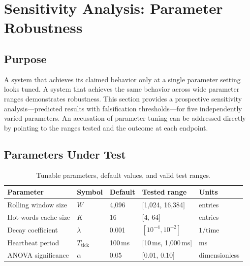 
\section{Sensitivity Analysis: Parameter Robustness}
\label{sec:sensitivity-analysis}

\subsection{Purpose}

A system that achieves its claimed behavior only at a single parameter setting
looks tuned. A system that achieves the same behavior across wide parameter
ranges demonstrates robustness. This section provides a prospective
sensitivity analysis---predicted results with falsification thresholds---for
five independently varied parameters. An accusation of parameter tuning can be
addressed directly by pointing to the ranges tested and the outcome at each
endpoint.

\subsection{Parameters Under Test}

\begin{table}[h]
\centering
\caption{Tunable parameters, default values, and valid test ranges.}
\begin{tabular}{lllll}
\toprule
\textbf{Parameter} & \textbf{Symbol} & \textbf{Default} & \textbf{Tested range} & \textbf{Units} \\
\midrule
Rolling window size & $W$ & 4{,}096 & [1{,}024, 16{,}384] & entries \\
Hot-words cache size & $K$ & 16 & [4, 64] & entries \\
Decay coefficient & $\lambda$ & 0.001 & $[10^{-4}, 10^{-2}]$ & $1/\text{time}$ \\
Heartbeat period & $T_{\text{tick}}$ & 100\,ms & [10\,ms, 1{,}000\,ms] & ms \\
ANOVA significance & $\alpha$ & 0.05 & [0.01, 0.10] & dimensionless \\
\bottomrule
\end{tabular}
\end{table}

